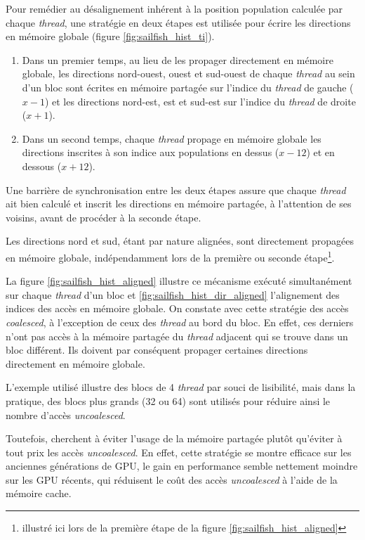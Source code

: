 Pour remédier au désalignement inhérent à la position population calculée par chaque \textit{thread}, une stratégie en deux étapes est utilisée pour écrire les directions en mémoire globale (figure \ref{fig:sailfish_hist_ti}). 
\begin{enumerate}
\item Dans un premier temps, au lieu de les propager directement en mémoire globale, les directions nord-ouest, ouest et sud-ouest de chaque \textit{thread} au sein d'un bloc sont écrites en mémoire partagée sur l'indice du \textit{thread} de gauche ($x-1$) et les directions nord-est, est et sud-est sur l'indice du \textit{thread} de droite ($x+1$).
\item Dans un second temps, chaque \textit{thread} propage en mémoire globale les directions inscrites à son indice aux populations en dessus ($x - 12$) et en dessous ($x + 12$).
\end{enumerate}
Une barrière de synchronisation entre les deux étapes assure que chaque \textit{thread} ait bien calculé et inscrit les directions en mémoire partagée, à l'attention de ses voisins, avant de procéder à la seconde étape.

Les directions nord et sud, étant par nature alignées, sont directement propagées en mémoire globale, indépendamment lors de la première ou seconde étape\footnote{illustré ici lors de la première étape de la figure \ref{fig:sailfish_hist_aligned}}. 

La figure \ref{fig:sailfish_hist_aligned} illustre ce mécanisme exécuté simultanément sur chaque \textit{thread} d'un bloc et \ref{fig:sailfish_hist_dir_aligned} l'alignement des indices des accès en mémoire globale. On constate avec cette stratégie des accès \textit{coalesced}, à l'exception de ceux des \textit{thread} au bord du bloc. En effet, ces derniers n'ont pas accès à la mémoire partagée du \textit{thread} adjacent qui se trouve dans un bloc différent. Ils doivent par conséquent propager certaines directions directement en mémoire globale.

L'exemple utilisé illustre des blocs de 4 \textit{thread} par souci de lisibilité, mais dans la pratique, des blocs plus grands (32 ou 64) sont utilisés pour réduire ainsi le nombre d'accès \textit{uncoalesced}.

Toutefois, \citet{obrecht_global_2011} cherchent à éviter l'usage de la mémoire partagée plutôt qu'éviter à tout prix les accès \textit{uncoalesced}. En effet, cette stratégie se montre efficace sur les anciennes générations de \acs{GPU}, le gain en performance semble nettement moindre sur les \acs{GPU} récents, qui réduisent le coût des accès \textit{uncoalesced} à l'aide de la mémoire cache. 


